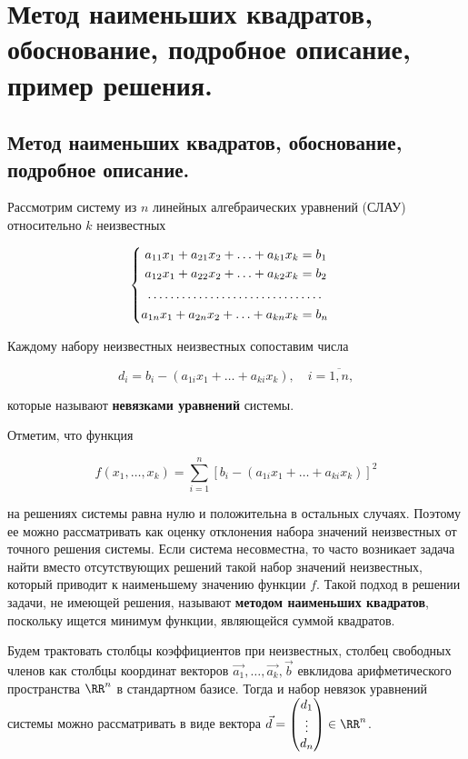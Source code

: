 \section{
    Метод наименьших квадратов, обоснование, подробное описание, пример решения.
}

\subsection{
    Метод наименьших квадратов, обоснование, подробное описание.
}

Рассмотрим систему из $n$ линейных алгебраических уравнений (СЛАУ) относительно $k$ неизвестных

\begin{equation}
    \begin{cases}
        \begin{aligned}
            a_{11} x_1 + a_{21} x_2 + \ldots + a_{k1} x_k &= b_1 \\
            a_{12} x_1 + a_{22} x_2 + \ldots + a_{k2} x_k &= b_2 \\
            \hdotsfor{2} \\
            a_{1n} x_1 + a_{2n} x_2 + \ldots + a_{kn} x_k &= b_n \\
        \end{aligned}
    \end{cases}
    \label{eq:slau_14_1}
\end{equation}

Каждому набору неизвестных неизвестных сопоставим числа

$$d_i = b_i - (a_{1i}x_1 + \ldots + a_{ki}x_k), \quad i = \overline{1, n},$$

которые называют \textbf{невязками уравнений} системы.

Отметим, что функция 

$$f(x_1, \ldots, x_k) = \sum_{i=1}^{n} [b_i - (a_{1i}x_1 + \ldots + a_{ki}x_k)]^2$$

на решениях системы равна нулю и положительна в остальных случаях. Поэтому ее можно рассматривать как оценку отклонения набора значений неизвестных от точного решения системы. Если система несовместна, то часто возникает задача найти вместо отсутствующих решений такой набор значений неизвестных, который приводит к наименьшему значению функции $f$. Такой подход в решении задачи, не имеющей решения, называют \textbf{методом наименьших квадратов}, поскольку ищется минимум функции, являющейся суммой квадратов.

Будем трактовать столбцы коэффициентов при неизвестных, столбец свободных членов как столбцы координат векторов $\vec{a_1}, \ldots, \vec{a_k}, \vec{b}$ евклидова арифметического пространства $\RR^n$ в стандартном базисе. Тогда и набор невязок уравнений системы можно рассматривать в виде вектора $\vec{d} = \begin{pmatrix} d_1 \\ \vdots \\ d_n \end{pmatrix} \in \RR^n$.

